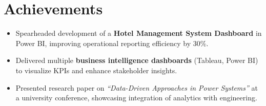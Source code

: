 \documentclass[a4paper,11pt]{article}
\newcommand{\resumeItem}[1]{
  \item\small{{#1 \vspace{-2pt}}}
}
\begin{document}
\section*{Achievements}
\begin{itemize}[leftmargin=*]
  \resumeItem{Spearheaded development of a \textbf{Hotel Management System Dashboard} in Power BI, improving operational reporting efficiency by 30\%.}
  \resumeItem{Delivered multiple \textbf{business intelligence dashboards} (Tableau, Power BI) to visualize KPIs and enhance stakeholder insights.}
  \resumeItem{Presented research paper on \textit{“Data-Driven Approaches in Power Systems”} at a university conference, showcasing integration of analytics with engineering.}
\end{itemize}
\end{document}
